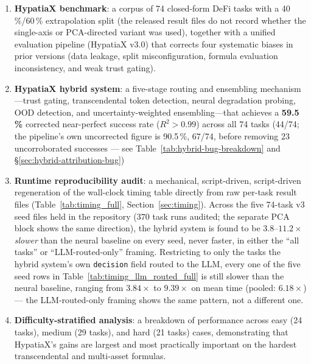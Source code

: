 \documentclass[twoside,11pt]{article}
\newcommand{\Rsq}{R^{2}}
\begin{document}
\begin{enumerate}[leftmargin=2em,label=(\roman*)]
  \item \textbf{HypatiaX benchmark}: a corpus of 74 closed-form DeFi tasks
    with a 40\,\%/60\,\% extrapolation split (the released result files do not record whether the single-axis or PCA-directed variant was used), together
    with a unified evaluation pipeline (HypatiaX v3.0) that corrects four
    systematic biases in prior versions (data leakage, split misconfiguration,
    formula evaluation inconsistency, and weak trust gating).

  \item \textbf{HypatiaX hybrid system}: a five-stage routing and ensembling
    mechanism---trust gating, transcendental token detection, neural degradation
    probing, OOD detection, and uncertainty-weighted ensembling---that achieves
    a \textbf{59.5\,\%} corrected near-perfect success rate ($\Rsq>0.99$) across
    all 74 tasks (44/74; the pipeline's own uncorrected figure is 90.5\,\%, 67/74,
    before removing 23 uncorroborated successes --- see Table~\ref{tab:hybrid-bug-breakdown}
    and \S\ref{sec:hybrid-attribution-bug})

  \item \textbf{Runtime reproducibility audit}: a mechanical, script-driven,
    script-driven regeneration of the wall-clock timing table
    directly from raw per-task result files (Table~\ref{tab:timing_full},
    Section~\ref{sec:timing}). Across the five 74-task v3 seed files held in the
    repository ($370$ task runs audited; the separate PCA block shows the same
    direction), the hybrid
    system is found to be $3.8$--$11.2\times$ \emph{slower} than the neural
    baseline on every seed, never faster, in either the
    ``all tasks'' or ``LLM-routed-only'' framing. Restricting to only the
    tasks the hybrid system's own \texttt{decision} field routed to the LLM,
    every one of the five seed rows in Table~\ref{tab:timing_llm_routed_full}
    is still slower than the neural baseline, ranging from $3.84\times$ to
    $9.39\times$ on mean time (pooled: $6.18\times$)
    --- the LLM-routed-only framing shows the same pattern, not a different one.

  \item \textbf{Difficulty-stratified analysis}: a breakdown of performance across
    easy (24 tasks), medium (29 tasks), and hard (21 tasks) cases, demonstrating
    that HypatiaX's gains are largest and most practically important on the hardest
    transcendental and multi-asset formulas.
\end{enumerate}
\end{document}
